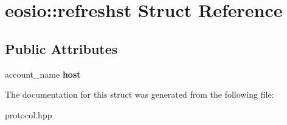 \hypertarget{structeosio_1_1refreshst}{}\section{eosio\+:\+:refreshst Struct Reference}
\label{structeosio_1_1refreshst}
\subsection*{Public Attributes}
\begin{DoxyCompactItemize}
\item 
\mbox{\label{structeosio_1_1refreshst_a79482296e8586ea97f4ea5acddfc2486}} 
account\+\_\+name {\bfseries host}
\end{DoxyCompactItemize}


The documentation for this struct was generated from the following file\+:\begin{DoxyCompactItemize}
\item 
protocol.\+hpp\end{DoxyCompactItemize}
